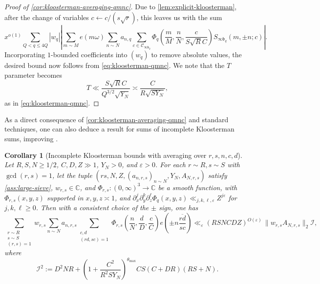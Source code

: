 \documentclass[reqno,11pt]{amsart}
\newtheorem{corollary}[theorem]{Corollary}
\theoremstyle{remark}
\numberwithin{equation}{section}
\newcommand{\C}{\mathbb{C}}
\newcommand{\msI}{\mathscr{I}}
\newcommand{\mC}{\mathcal{C}}
\newcommand{\mb}{\mathfrak{b}}
\newcommand{\eps}{\varepsilon}
\renewcommand{\bar}{\overline}
\begin{document}
\begin{proof}[Proof of \cref{cor:kloosterman-averaging-qmnc}]
Due to \cref{lem:explicit-kloosterman}, after the change of variables $c \gets c/(s\sqrt{r})$, this leaves us with the sum
\[
    x^{o(1)} \sum_{Q < q \le 4Q}
    |w_q| \left\vert
    \sum_{m \sim M} e(m\omega)
    \sum_{n \sim N} a_{n,q}
    \sum_{c \in \mC_{\infty \mb_q}}
    \Phi_q \left(\frac{m}{M}, \frac{n}{N}, \frac{c}{S\sqrt{R}C}\right)
    S_{\infty \mb_q}(m, \pm n; c)
    \right\vert.
\]
Incorporating $1$-bounded coefficients into $(w_q)$ to remove absolute values, the desired bound now follows from \cref{eq:kloosterman-qmnc}. We note that the $T$ parameter becomes
\[
    T \ll \frac{S\sqrt{R} C}{Q^{3/2} \sqrt{Y_N}} \asymp \frac{C}{R\sqrt{S Y_N}},
\]
as in \cref{eq:kloosterman-qmnc}.
\end{proof}

As a direct consequence of \cref{cor:kloosterman-averaging-qmnc} and standard techniques, one can also deduce a result for sums of incomplete Kloosterman sums, improving \cite[Theorem 12]{deshouillers1982kloosterman}.

\begin{corollary}[Incomplete Kloosterman bounds with averaging over $r, s, n, c, d$] \label{cor:kloosterman-incomplete}
Let $R, S, N \ge 1/2$, $C, D, Z \gg 1$, $Y_N > 0$, and $\eps > 0$. For each $r \sim R, s \sim S$ with $\gcd(r, s) = 1$, let the tuple $(rs, N, Z, (a_{n,r,s})_{n \sim N}, Y_N, A_{N,r,s})$ satisfy \cref{ass:large-sieve}, $w_{r,s} \in \C$, and $\Phi_{r,s} : (0, \infty)^3 \to \C$ be a smooth function, with $\Phi_{r,s}(x, y, z)$ supported in $x, y, z \asymp 1$, and $\partial_x^j \partial_y^k \partial_z^\ell \Phi_q(x, y, z) \ll_{j,k,\ell,\eps} Z^{j\eps}$ for $j, k, \ell \ge 0$. Then with a consistent choice of the $\pm$ sign, one has
\begin{equation} \label{eq:kloosterman-incomplete}
    \sum_{\substack{r \sim R \\ s \sim S \\ (r, s) = 1}} w_{r,s}
    \sum_{n \sim N} a_{n,r,s}
    \sum_{\substack{c, d \\ (rd, sc) = 1}} \Phi_{r,s}\left(\frac{n}{N}, \frac{d}{D}, \frac{c}{C}\right) e\left(\pm n \frac{\bar{rd}}{sc}\right)
    \ll_\eps 
    (RSNCDZ)^{O(\eps)}\, \|w_{r,s} A_{N,r,s}\|_2 \msI,
\end{equation}
where
\[
    \msI^2 := D^2 NR
    +
    \left(1 + \frac{C^2}{R^2 S Y_N}\right)^{\theta_{\max}} 
    CS(C + DR)(RS + N).
\]
\end{corollary}
\end{document}
